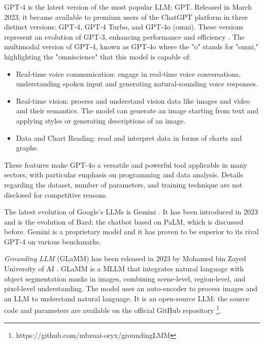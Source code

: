 GPT-4 is the latest version of the most popular LLM: GPT.
Released in March 2023, it became available to premium users of the ChatGPT platform in three distinct versions: GPT-4, GPT-4 Turbo, and GPT-4o (omni).
These versions represent an evolution of GPT-3, enhancing performance and efficiency \cite{insights_gpt4}.
The multimodal version of GPT-4, known as GPT-4o where the "o" stands for "omni," highlighting the "omniscience" that this model is capable of:
\begin{itemize}
    \item Real-time voice communication: engage in real-time voice conversations, understanding spoken input and generating natural-sounding voice responses.
    
    \item Real-time vision: process and understand vision data like images and video and their semantics. The model can generate an image starting from text and applying styles or generating descriptions of an image.
    
    \item Data and Chart Reading: read and interpret data in forms of charts and graphs.
\end{itemize}
These features make GPT-4o a versatile and powerful tool applicable in many sectors, with particular emphasis on programming and data analysis.
Details regarding the dataset, number of parameters, and training technique are not disclosed for competitive reasons.

The latest evolution of Google's LLMs is Gemini \cite{gemini_introduction}.
It has been introduced in 2023 and is the evolution of Bard: the chatbot based on PaLM, which is discussed before.
Gemini is a proprietary model and it has proven to be superior to its rival GPT-4 on various benchmarks.

\textit{Grounding LLM} (GLaMM) has been released in 2023 by Mohamed bin Zayed University of AI \cite{rasheed2024glamm}.
GLaMM is a MLLM that integrates natural language with object segmentation masks in images, combining scene-level, region-level, and pixel-level understanding.
The model uses an auto-encoder to process images and an LLM to understand natural language.
It is an open-source LLM: the source code and parameters are available on the official GitHub repository \footnote{https://github.com/mbzuai-oryx/groundingLMM}.
